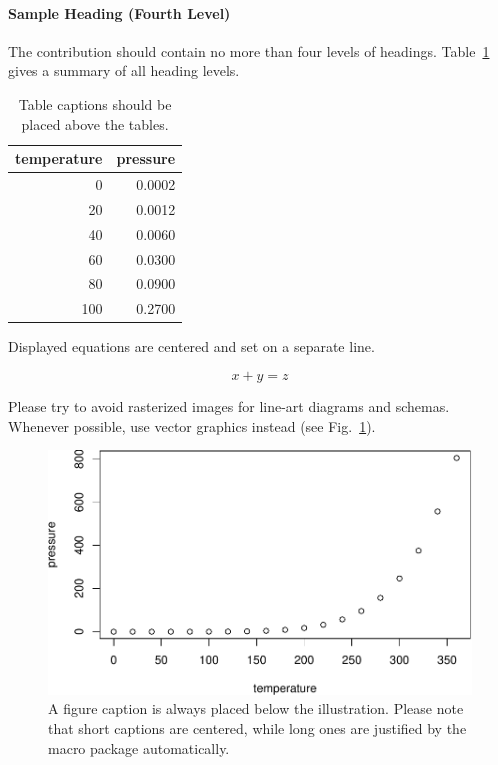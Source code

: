 \documentclass[runningheads]{llncs}
\begin{document}
\hypertarget{sample-heading-fourth-level}{%
\paragraph{Sample Heading (Fourth
Level)}\label{sample-heading-fourth-level}}

The contribution should contain no more than four levels of headings.
Table~\ref{tab:table} gives a summary of all heading levels.

\begin{table}

\caption{\label{tab:table}Table captions should be placed above the tables.}
\centering
\begin{tabular}[t]{r|r}
\hline
temperature & pressure\\
\hline
0 & 0.0002\\
\hline
20 & 0.0012\\
\hline
40 & 0.0060\\
\hline
60 & 0.0300\\
\hline
80 & 0.0900\\
\hline
100 & 0.2700\\
\hline
\end{tabular}
\end{table}

\noindent Displayed equations are centered and set on a separate line.

\begin{equation}
x + y = z
\end{equation}

Please try to avoid rasterized images for line-art diagrams and schemas.
Whenever possible, use vector graphics instead (see
Fig.~\ref{fig:fig1}).

\begin{figure}
\includegraphics{manuscript_files/figure-latex/fig1-1} \caption{A figure caption is always placed below the illustration. Please note that short captions are centered, while long ones are justified by the macro package automatically.}\label{fig:fig1}
\end{figure}
\end{document}

